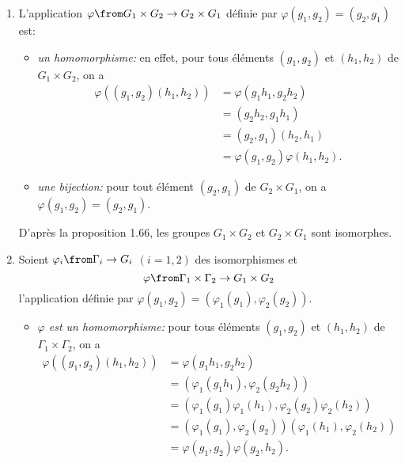 \begin{enumerate}
  \item 
    L'application $\varphi\from G_1\times G_2\to G_2\times G_1$ définie par $\varphi(g_1,g_2) = (g_2,g_1)$ est:
    \begin{itemize}
      \item 
        \textit{un homomorphisme:}
        en effet, pour tous éléments $(g_1,g_2)$ et $(h_1,h_2)$ de $G_1\times G_2$, on a
        \begin{align*}
          \varphi((g_1,g_2)(h_1,h_2))
            &= \varphi(g_1h_1, g_2h_2) \\
            &= (g_2h_2, g_1h_1) \\
            &= (g_2,g_1)(h_2,h_1) \\
            &= \varphi(g_1,g_2)\varphi(h_1,h_2).
        \end{align*}

      \item
        \textit{une bijection:}
        pour tout élément $(g_2,g_1)$ de $G_2\times G_1$, on a $\varphi(g_1,g_2) = (g_2,g_1)$.
    \end{itemize}

    D'après la proposition 1.66, les groupes $G_1\times G_2$ et $G_2\times G_1$ sont isomorphes.

  \item
    Soient $\varphi_i\from\Gamma_i\to G_i$ $(i = 1,2)$ des isomorphismes et
    \[
      \varphi\from\Gamma_1\times\Gamma_2\to G_1\times G_2
    \]
    l'application définie par $\varphi(g_1,g_2) = (\varphi_1(g_1),\varphi_2(g_2))$.
    
    \begin{itemize}
      \item 
        \textit{$\varphi$ est un homomorphisme:}
        pour tous éléments $(g_1,g_2)$ et $(h_1,h_2)$ de $\Gamma_1\times\Gamma_2$, on a
        \begin{align*}
          \varphi((g_1,g_2)(h_1,h_2))
            &= \varphi(g_1h_1,g_2h_2) \\
            &= (\varphi_1(g_1h_1),\varphi_2(g_2h_2)) \\
            &= (\varphi_1(g_1)\varphi_1(h_1),\varphi_2(g_2)\varphi_2(h_2)) \\
            &= (\varphi_1(g_1),\varphi_2(g_2))(\varphi_1(h_1),\varphi_2(h_2)) \\
            &= \varphi(g_1,g_2)\varphi(g_2,h_2).
        \end{align*}


\end{itemize}
\end{enumerate}
